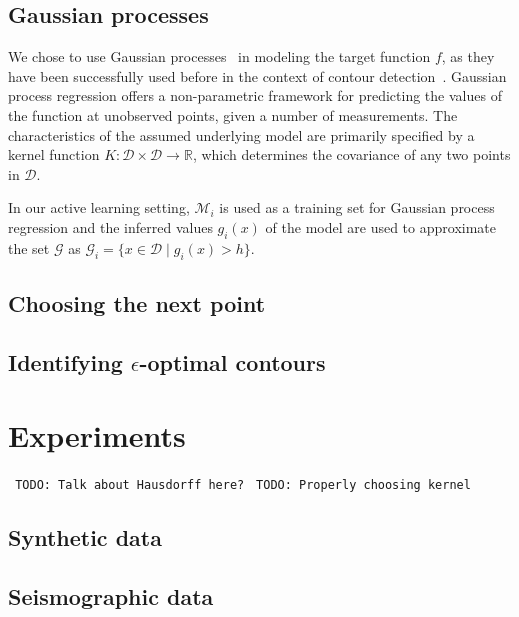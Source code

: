 \documentclass[11pt]{article} %
\newcommand{\todo}[1]{\noindent\texttt{\color[rgb]{0.5,0.1,0.1} TODO: #1}}
\begin{document}
\subsection{Gaussian processes}
We chose to use Gaussian processes~\cite{gpbook} in modeling the target
function $f$, as they have been successfully used before in the context of
contour detection~\cite{bryan2005, bryan2008}. Gaussian process regression
offers a non-parametric framework for predicting the values of the function at
unobserved points, given a number of measurements. The characteristics of
the assumed underlying model are primarily specified by a kernel function
${K : \mathcal{D} \times \mathcal{D} \to \mathbb{R}}$, which determines the
covariance of any two points in $\mathcal{D}$.

In our active learning setting, $\mathcal{M}_i$ is used as a training set
for Gaussian process regression and the inferred values $g_i(x)$ of the
model are used to approximate the set $\mathcal{G}$ as
${\mathcal{G}_i = \{x \in \mathcal{D} \mid g_i(x) > h\}}$.

\subsection{Choosing the next point}

\subsection{Identifying $\epsilon$-optimal contours}

\section{Experiments}

\todo{Talk about Hausdorff here?}
\todo{Properly choosing kernel}

\subsection{Synthetic data}

\subsection{Seismographic data}



\end{document}
